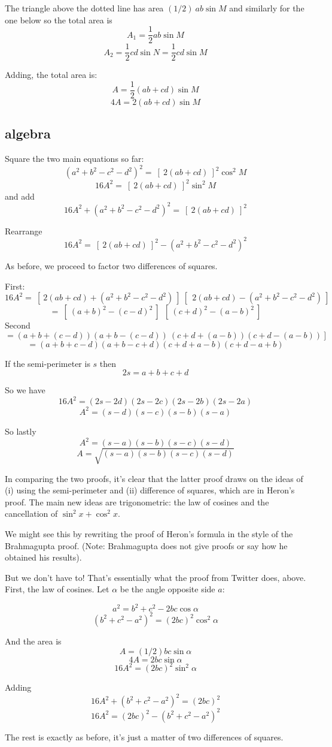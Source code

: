 \documentclass[11pt, oneside]{article}
\begin{document}
The triangle above the dotted line has area $(1/2) \ ab \sin M$ and similarly for the one below so the total area is
\[ A_1 = \frac{1}{2} ab \sin M \]
\[ A_2 = \frac{1}{2} cd \sin N = \frac{1}{2} cd \sin M \]

Adding, the total area is:
\[ A  =  \frac{1}{2}(ab + cd) \sin M \]
\[ 4A =  2(ab + cd) \sin M \]

\subsection*{algebra}

Square the two main equations so far:
\[ (a^2 + b^2 - c^2 - d^2)^2 =  \ [ \ 2(ab + cd) \ ]^2 \cos^2 M \]
\[ 16A^2 =  \ [ \ 2(ab + cd) \ ]^2 \sin^2 M \]
and add
\[ 16A^2 + (a^2 + b^2 - c^2 - d^2)^2 =   \ [ \ 2(ab + cd) \ ]^2 \]

Rearrange
\[ 16A^2 =   \ [ \ 2(ab + cd) \ ]^2 - (a^2 + b^2 - c^2 - d^2)^2 \]

As before, we proceed to factor two differences of squares.  

First:
\[ 16A^2 =   \ [ \ 2(ab + cd) + (a^2 + b^2 - c^2 - d^2) \ ] \ [ \ \ 2(ab + cd) - (a^2 + b^2 - c^2 - d^2) \ ] \]
\[ = \ [ \ (a + b)^2 - (c - d)^2 \ ] \  \ [ \ (c + d)^2 - (a - b)^2 \ ] \]
Second
\[ = (a + b + (c - d))(a + b - (c - d)) \ (c + d + (a - b))(c + d - (a - b)) \ ] \]
\[ = (a + b + c - d)(a + b - c + d)(c + d + a - b)(c + d - a + b) \]

If the semi-perimeter is $s$ then
\[ 2s = a + b + c + d \]

So we have
\[ 16A^2 = (2s - 2d)(2s - 2c)(2s - 2b)(2s - 2a) \]
\[ A^2 = (s - d)(s - c)(s - b)(s - a) \]

So lastly
\[ A^2 = (s - a)(s - b)(s - c)(s - d) \]
\[ A = \sqrt{(s - a)(s - b)(s - c)(s - d)} \]

In comparing the two proofs, it's clear that the latter proof draws on the ideas of (i) using the semi-perimeter and (ii) difference of squares, which are in Heron's proof.  The main new ideas are trigonometric:  the law of cosines and the cancellation of $\sin^2 x + \cos^2 x$.

We might see this by rewriting the proof of Heron's formula in the style of the Brahmagupta proof.  (Note:  Brahmagupta does not give proofs or say how he obtained his results).

But we don't have to!  That's essentially what the proof from Twitter does, above.  First, the law of cosines.  Let $\alpha$ be the angle opposite side $a$:

\[ a^2 = b^2 + c^2 - 2bc \cos \alpha \]
\[ (b^2 + c^2 - a^2)^2 = (2bc)^2 \cos^2 \alpha \]

And the area is
\[ A = (1/2) bc \sin \alpha \]
\[ 4A = 2bc \sin \alpha \]
\[ 16A^2 = (2bc)^2 \sin^2 \alpha \]

Adding
\[ 16A^2 + (b^2 + c^2 - a^2)^2 = (2bc)^2  \]
\[ 16A^2 = (2bc)^2 - (b^2 + c^2 - a^2)^2  \]

The rest is exactly as before, it's just a matter of two differences of squares.
\end{document}
